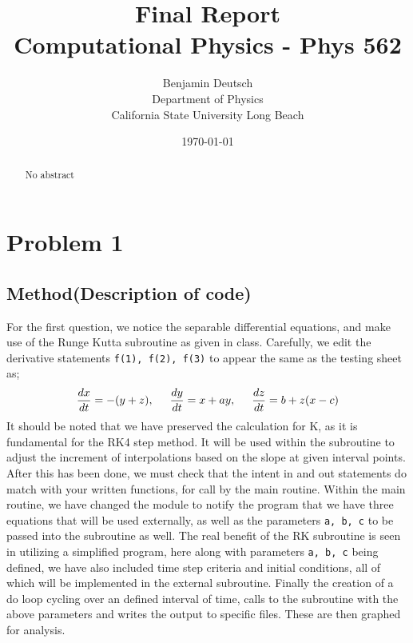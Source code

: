 \documentclass[12pt,letterpaper,notitlepage]{article}
\begin{document}




\title{%
	Final Report   \\
\large Computational Physics - Phys 562}
\author{Benjamin Deutsch  \\
Department of Physics\\
California State University Long Beach}
\date{\today}
\maketitle



\begin{abstract}
No abstract    
\end{abstract}

\section{Problem 1}
\subsection{Method(Description of code)}
For the first question, we notice the separable differential equations, and make use of the Runge Kutta subroutine as given in class. Carefully, we edit the derivative statements {\tt{f(1), f(2), f(3)}} to appear the same as the testing sheet as;
	\begin{equation}
		\frac{dx}{dt}=-(y+z),\hspace{5mm} \frac{dy}{dt}=x+ay, \hspace{5mm} \frac{dz}{dt}=b+z(x-c)
	\end{equation}
It should be noted that we have preserved the calculation for K, as it is fundamental for the RK4 step method. It will be used within the subroutine to adjust the increment of interpolations based on the slope at given interval points.  After this has been done, we must check that the intent in and out statements do match with your written functions, for call by the main routine. 
Within the main routine, we have changed the module to notify the program that we have three equations that will be used externally, as well as the parameters {\tt a, b, c} to be passed into the subroutine as well. The real benefit of the RK subroutine is seen in utilizing a simplified program, here along with parameters {\tt a, b, c} being defined, we have also included time step criteria and initial conditions, all of which will be implemented in the external subroutine. Finally the creation of a do loop cycling over an defined interval of time, calls to the subroutine with the above parameters and writes the output to specific files.  These are then graphed for analysis.  	
\end{document}
